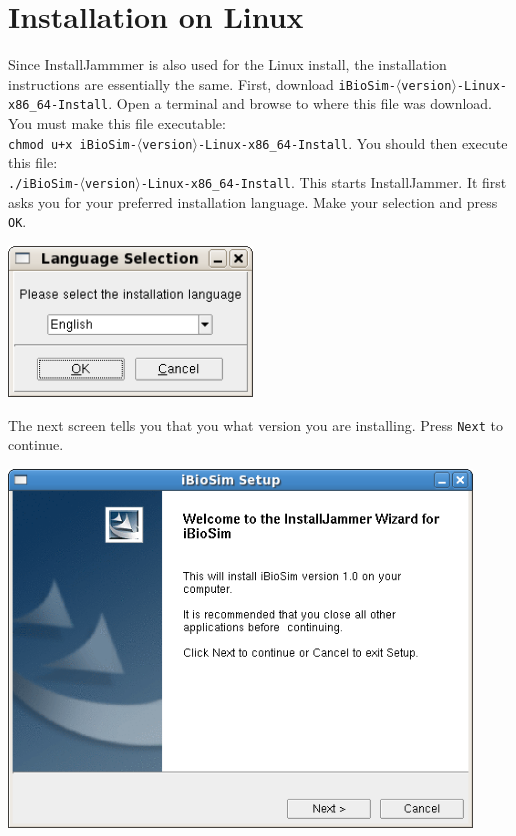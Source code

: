 \documentclass[titlepage,11pt]{article}
\begin{document}
\section{Installation on Linux}

\noindent
Since InstallJammmer is also used for the Linux install, the
installation instructions are essentially the same.
First, download {\tt iBioSim-$\langle$version$\rangle$-Linux-x86\_64-Install}.
Open a terminal and browse to where this file was download.  You must
make this file executable:\\
{\tt chmod u+x iBioSim-$\langle$version$\rangle$-Linux-x86\_64-Install}.
You should then execute this file:\\
{\tt ./iBioSim-$\langle$version$\rangle$-Linux-x86\_64-Install}. 
This starts InstallJammer.  It first asks you for your
preferred installation language.  Make your selection and press {\tt OK}.

\includegraphics[height=40mm]{screenshots/language}

\clearpage

The next screen tells you that you what version you are installing.
Press {\tt Next} to continue.

\includegraphics[height=95mm]{screenshots/setup}
\end{document}
